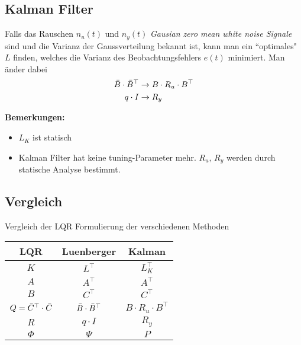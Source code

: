 \subsection{Kalman Filter}
    Falls das Rauschen $n_u(t)$ und $n_y(t)$ \emph{Gausian zero mean white noise Signale} sind und die Varianz der Gaussverteilung bekannt ist, kann man ein ``optimales" $L$ finden, welches die Varianz des Beobachtungsfehlers $e(t)$ minimiert. Man änder dabei
    \begin{align*}
        \Bar{B}\cdot\Bar{B}^\top &\rightarrow B\cdot R_u \cdot B^\top\\
        q\cdot I &\rightarrow R_y
    \end{align*}
    
    \textbf{Bemerkungen:}
    \begin{itemize}
        \item $L_K$ ist statisch
        \item Kalman Filter hat keine tuning-Parameter mehr. $R_u,\, R_y$ werden durch statische Analyse bestimmt.
    \end{itemize}
    
    \subsection{Vergleich}
        Vergleich der LQR Formulierung der verschiedenen Methoden
        \begin{center}
            {\renewcommand{\arraystretch}{1.4}
            \begin{tabular}{c|c|c}
                LQR &   Luenberger  &   Kalman  \\
                \hline
                $K$ &   $L^\top$    &   $L^\top_K$\\
                \hline
                $A$ &   $A^\top$    &   $A^\top$\\
                $B$ &   $C^\top$    &   $C^\top$\\
                $Q = \Bar{C}^\top\cdot\Bar{C}$  &   $\Bar{B}\cdot\Bar{B}^\top$    &   $B\cdot R_u  \cdot B^\top$\\
                $R$ & $q\cdot I$    &   $R_y$\\
                $\Phi$ & $\Psi$     &   $P$
            \end{tabular}
            }
        \end{center}